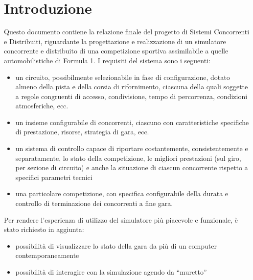 \chapter{Introduzione} %

\label{Chapter1} %


Questo documento contiene la relazione finale del progetto di Sistemi Concorrenti e Distribuiti, riguardante la progettazione e realizzazione di un simulatore concorrente e distribuito di una competizione sportiva assimilabile a quelle automobilistiche di Formula 1.
I requisiti del sistema sono i seguenti:
\begin{itemize}
 \item un circuito, possibilmente selezionabile in fase di configurazione, dotato almeno della pista e della corsia di rifornimento, ciascuna della quali soggette a regole congruenti di accesso, condivisione, tempo di percorrenza, condizioni atmosferiche, ecc.
 \item un insieme configurabile di concorrenti, ciascuno con caratteristiche specifiche di prestazione, risorse, strategia di gara, ecc.
 \item un sistema di controllo capace di riportare costantemente, consistentemente e separatamente, lo stato della competizione, le migliori prestazioni (sul giro, per sezione di circuito) e anche la situazione di ciascun concorrente rispetto a specifici parametri tecnici
 \item una particolare competizione, con specifica configurabile della durata e controllo di terminazione dei concorrenti a fine gara.
\end{itemize}
Per rendere l'esperienza di utilizzo del simulatore più piacevole e funzionale, è stato richiesto in aggiunta:
\begin{itemize}
\item possibilità di visualizzare lo stato della gara da più di un computer contemporaneamente
\item possibilità di interagire con la simulazione agendo da “muretto”
\end{itemize}
